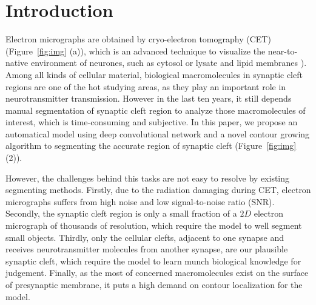 \section{Introduction}
\label{sec:intro}
Electron micrographs are obtained by cryo-electron tomography (CET) \cite{Hawkes2007} (Figure~\ref{fig:img} (a)), which is an advanced technique to visualize the near-to-native environment of neurones, such as cytosol or lysate and lipid membranes \cite{Lucic2005a}).
Among all kinds of cellular material, biological macromolecules in synaptic cleft regions are one of the hot studying areas, as they play an important role in neurotransmitter transmission.
However in the last ten years, it still depends manual segmentation of synaptic cleft region to analyze those macromolecules of interest, which is time-consuming and subjective.
In this paper, we propose an automatical model using deep convolutional network and a novel contour growing algorithm to segmenting the accurate region of synaptic cleft (Figure~\ref{fig:img} (2)).

However, the challenges behind this tasks are not easy to resolve by existing segmenting methods.
Firstly, due to the radiation damaging during CET, electron micrographs suffers from high noise and low signal-to-noise ratio (SNR).
Secondly, the synaptic cleft region is only a small fraction of a $2D$ electron micrograph of thousands of resolution, which require the model to well segment small objects.
Thirdly, only the cellular clefts, adjacent to one synapse and receives neurotransmitter molecules from another synapse, are our plausible synaptic cleft, which require the model to learn munch biological knowledge for judgement.
Finally, as the most of concerned macromolecules exist on the surface of presynaptic membrane, it puts a high demand on contour localization for the model.


